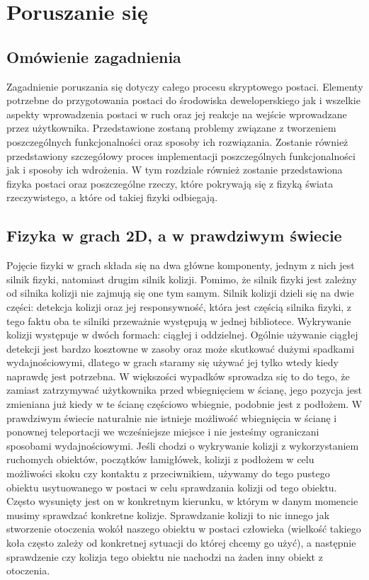 \documentclass[oneside,polski,logo]{amuthesis}
\begin{document}
\section{Poruszanie się}
\subsection{Omówienie zagadnienia}
Zagadnienie poruszania się dotyczy całego procesu skryptowego postaci. Elementy potrzebne do przygotowania postaci do środowiska deweloperskiego jak i wszelkie aspekty wprowadzenia postaci w ruch oraz jej reakcje na wejście wprowadzane przez użytkownika. Przedstawione zostaną problemy związane z tworzeniem poszczególnych funkcjonalności oraz sposoby ich rozwiązania. Zostanie również przedstawiony szczegółowy proces implementacji poszczególnych funkcjonalności jak i sposoby ich wdrożenia. W tym rozdziale również zostanie przedstawiona fizyka postaci oraz poszczególne rzeczy, które pokrywają się z fizyką świata rzeczywistego, a które od takiej fizyki odbiegają.
\subsection{Fizyka w grach 2D, a w prawdziwym świecie}
 Pojęcie fizyki w grach składa się na dwa główne komponenty, jednym z nich jest silnik fizyki, natomiast drugim silnik kolizji. Pomimo, że silnik fizyki jest zależny od silnika kolizji nie zajmują się one tym samym.
Silnik kolizji dzieli się na dwie części: detekcja kolizji oraz jej responsywność, która jest częścią silnika fizyki, z tego faktu oba te silniki przeważnie występują w jednej bibliotece. Wykrywanie kolizji występuje w dwóch formach: ciągłej i oddzielnej. Ogólnie używanie ciągłej detekcji jest bardzo kosztowne w zasoby oraz może skutkować dużymi spadkami wydajnościowymi, dlatego w grach staramy się używać jej tylko wtedy kiedy naprawdę jest potrzebna. W większości wypadków sprowadza się to do tego, że zamiast zatrzymywać użytkownika przed wbiegnięciem w ścianę, jego pozycja jest zmieniana już kiedy w te ścianę częściowo wbiegnie, podobnie jest z podłożem. W prawdziwym świecie naturalnie nie istnieje możliwość wbiegnięcia w ścianę i ponownej teleportacji we wcześniejsze miejsce i nie jesteśmy ograniczani sposobami wydajnościowymi. Jeśli chodzi o wykrywanie kolizji z wykorzystaniem ruchomych obiektów, początków łamigłówek, kolizji z podłożem w celu możliwości skoku czy kontaktu z przeciwnikiem, używamy do tego pustego obiektu usytuowanego w postaci w celu sprawdzania kolizji od tego obiektu. Często wysunięty jest on w konkretnym kierunku, w którym w danym momencie musimy sprawdzać konkretne kolizje. Sprawdzanie kolizji to nic innego jak stworzenie otoczenia wokół naszego obiektu w postaci człowieka (wielkość takiego koła często zależy od konkretnej sytuacji do której chcemy go użyć), a następnie sprawdzenie czy kolizja tego obiektu nie nachodzi na żaden inny obiekt z otoczenia. \cite{physics1}
\end{document}
